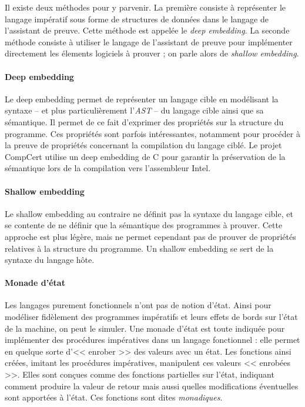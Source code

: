 			Il existe deux méthodes pour y parvenir. La première consiste à représenter le langage impératif sous forme de structures de données dans le langage de l'assistant de preuve. Cette méthode est appelée le \emph{deep embedding}. La seconde méthode consiste à utiliser le langage de l'assistant de preuve pour implémenter directement les élements logiciels à prouver ; on parle alors de \emph{shallow embedding}.

				\paragraph{Deep embedding} Le deep embedding permet de représenter un langage cible en modélisant la syntaxe -- et plus particulièrement l'\emph{AST} -- du langage cible ainsi que sa sémantique. Il permet de ce fait d'exprimer des propriétés sur la structure du programme. Ces propriétés sont parfois intéressantes, notamment pour procéder à la preuve de propriétés concernant la compilation du langage ciblé. Le projet CompCert utilise un deep embedding de C pour garantir la préservation de la sémantique lors de la compilation vers l'assembleur Intel.
				\paragraph{Shallow embedding} Le shallow embedding au contraire ne définit pas la syntaxe du langage cible, et se contente de ne définir que la sémantique des programmes à prouver. Cette approche est plus légère, mais ne permet cependant pas de prouver de propriétés relatives à la structure du programme. Un shallow embedding se sert de la syntaxe du langage hôte.

				\label{monad}
				\paragraph{Monade d'état} Les langages purement fonctionnels n'ont pas de notion d'état. Ainsi pour modéliser fidèlement des programmes impératifs et leurs effets de bords sur l'état de la machine, on peut le simuler. Une monade d'état est toute indiquée pour implémenter des procédures impératives dans un langage fonctionnel : elle permet en quelque sorte d'<< enrober >> des valeurs avec un état. Les fonctions ainsi créées, imitant les procédures impératives, manipulent ces valeurs << enrobées >>. Elles sont conçues comme des fonctions partielles sur l'état, indiquant comment produire la valeur de retour mais aussi quelles modifications éventuelles sont apportées à l'état. Ces fonctions sont dites \emph{monadiques}. 

